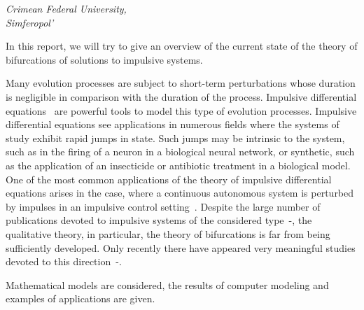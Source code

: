 
	
\begin{center}
	\maketitle
	{\large\textit{Crimean Federal University,\\
			Simferopol'}}
\end{center}

In this report, we will try to give an overview of the current state of the theory of bifurcations of solutions to impulsive systems.

Many evolution processes are subject to short-term perturbations whose duration is negligible in
comparison with the duration of the process. Impulsive differential equations~\cite{samoilenko-perestyuk1987, samoilenko-perestyuk1995} are powerful tools to model this type of evolution processes. Impulsive differential equations see applications in numerous fields where the systems of study exhibit rapid jumps in state. Such jumps may be intrinsic to the system,
such as in the firing of a neuron in a biological neural network, or synthetic, such as the application of
an insecticide or antibiotic treatment in a biological model. One of the most common applications of
the theory of impulsive differential equations arises in the case, where a continuous autonomous
system is perturbed by impulses in an impulsive control setting~\cite{Lakmeche_Arino2001, Xie2017}. Despite the large number of publications devoted to impulsive systems of the considered type~\cite{Hristova}-\cite{Anashkin2021}, the qualitative theory, in particular, the theory of bifurcations  is far from being sufficiently developed. Only recently there have appeared very meaningful studies devoted to this direction~\cite{Church_Liu2017}-\cite{Akhmet_Kashkynbayev2017}.

Mathematical models are considered, the results of computer modeling and examples of applications are given.

